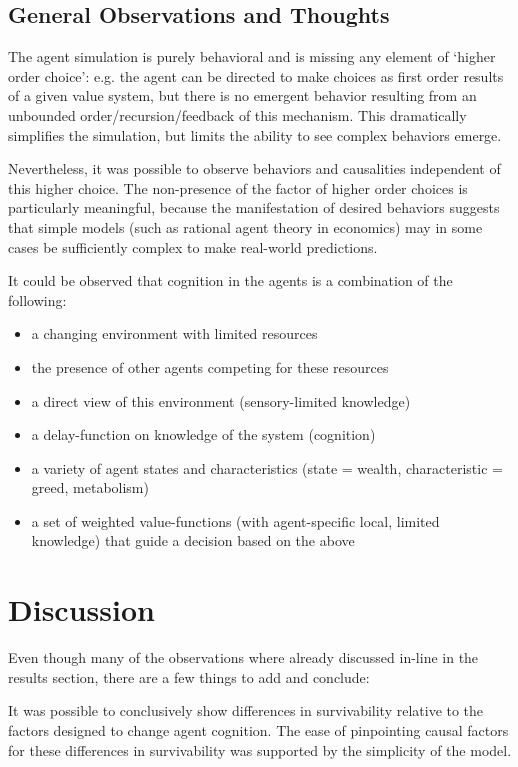\section{General Observations and Thoughts}

The agent simulation is purely behavioral and is missing any element of `higher order choice': e.g. the agent can be directed to make choices as first order results of a given value system, but there is no emergent behavior resulting from an unbounded order/recursion/feedback of this mechanism. This dramatically simplifies the simulation, but limits the ability to see complex behaviors emerge. 

Nevertheless, it was possible to observe behaviors and causalities independent of this higher choice. The non-presence of the factor of higher order choices is particularly meaningful, because the manifestation of desired behaviors suggests that simple models (such as rational agent theory in economics) may in some cases be sufficiently complex to make real-world predictions.

\noindent
It could be observed that cognition in the agents is a combination of the following:
\begin{itemize}
  \item a changing environment with limited resources
  \item the presence of other agents competing for these resources
  \item a direct view of this environment (sensory-limited knowledge)
  \item a delay-function on knowledge of the system (cognition)
  \item a variety of agent states and characteristics (state = wealth, characteristic = greed, metabolism)
  \item a set of weighted value-functions (with agent-specific local, limited knowledge) that guide a decision based on the above
\end{itemize}

\chapter{Discussion}

Even though many of the observations where already discussed in-line in the results section, there are a few things to add and conclude:

It was possible to conclusively show differences in survivability relative to the factors designed to change agent cognition. The ease of pinpointing causal factors for these differences in survivability was supported by the simplicity of the model.

